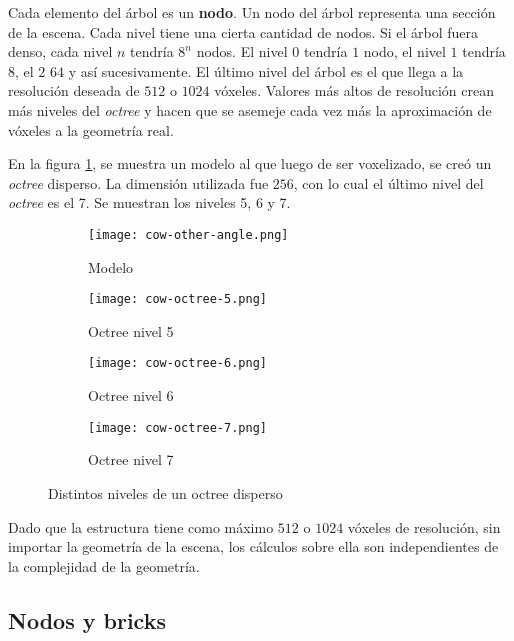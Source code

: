 Cada elemento del árbol es un \textbf{nodo}.
Un nodo del árbol representa una sección de la escena.
Cada nivel tiene una cierta cantidad de nodos.
Si el árbol fuera denso, cada nivel $n$ tendría $8^n$ nodos.
El nivel $0$ tendría $1$ nodo, el nivel $1$ tendría $8$, el $2$ $64$ y así sucesivamente. %
El último nivel del árbol es el que llega a la resolución deseada de $512$ o $1024$ vóxeles.
Valores más altos de resolución crean más niveles del \textit{octree} y hacen que se asemeje cada vez más la aproximación de vóxeles a la geometría real.

En la figura \ref{fig:octree-levels}, se muestra un modelo al que luego de ser voxelizado, se creó un \textit{octree} disperso.
La dimensión utilizada fue $256$, con lo cual el último nivel del \textit{octree} es el 7.
Se muestran los niveles 5, 6 y 7.

\begin{figure}[ht]
    \begin{subfigure}{.24\textwidth}
        \centering
        \texttt{[image: cow-other-angle.png]}
        \caption{Modelo}
    \end{subfigure}
    \begin{subfigure}{.24\textwidth}
        \centering
        \texttt{[image: cow-octree-5.png]}
        \caption{Octree nivel 5}
    \end{subfigure}
    \begin{subfigure}{.24\textwidth}
        \centering
        \texttt{[image: cow-octree-6.png]}
        \caption{Octree nivel 6}
    \end{subfigure}
    \begin{subfigure}{.24\textwidth}
        \centering
        \texttt{[image: cow-octree-7.png]}
        \caption{Octree nivel 7}
    \end{subfigure}
    \caption{Distintos niveles de un octree disperso}
    \label{fig:octree-levels}
\end{figure}

Dado que la estructura tiene como máximo $512$ o $1024$ vóxeles de resolución, sin importar la geometría de la escena, los cálculos sobre ella son independientes de la complejidad de la geometría.

\subsection{Nodos y bricks}\label{sec:nodes_and_bricks}

